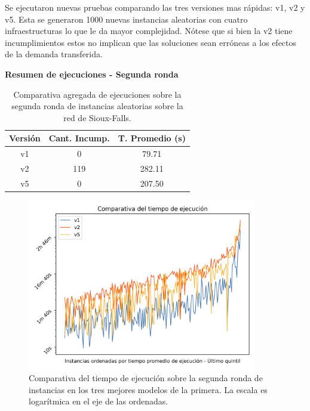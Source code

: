 \documentclass{article}
\begin{document}
  Se ejecutaron nuevas pruebas comparando las tres versiones mas rápidas: v1, v2 y v5. Esta se generaron 1000 nuevas instancias aleatorias con cuatro infraestructuras lo que le da mayor complejidad. Nótese que si bien la v2 tiene incumplimientos estos no implican que las soluciones sean erróneas a los efectos de la demanda transferida.


  \begin{table}[h!]
    \centering
    \caption*{{\bf Resumen de ejecuciones - Segunda ronda}}
    \begin{tabular}{ccc}
      \toprule
      Versión & Cant. Incump. & T. Promedio (s) \\
      \midrule
      v1 & 0   & 79.71   \\
      v2 & 119 & 282.11  \\
      v5 & 0   & 207.50  \\
      \bottomrule
    \end{tabular}
    \caption{Comparativa agregada de ejecuciones sobre la segunda ronda de instancias aleatorias sobre la red de Sioux-Falls.}\label{table:resumenreejecuciones}
  \end{table}

  \begin{figure}[h!]
    \centering
    \includegraphics[width=10cm]{../resources/run_time_comparsion_rerun.png}
    \caption{Comparativa del tiempo de ejecución sobre la segunda ronda de instancias en los tres mejores modelos de la primera. La escala es logarítmica en el eje de las ordenadas.} \label{fig:runtimecomparisonrerun}
  \end{figure}
\end{document}
